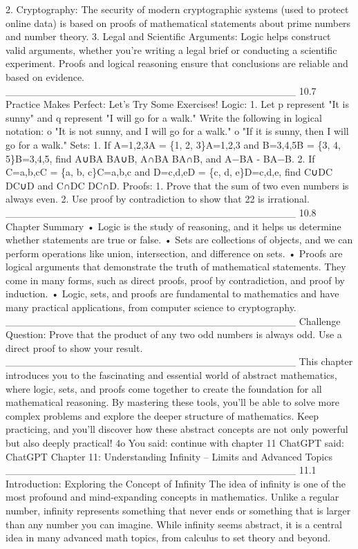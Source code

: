 2.	Cryptography: The security of modern cryptographic systems (used to protect online data) is based on proofs of mathematical statements about prime numbers and number theory.
3.	Legal and Scientific Arguments: Logic helps construct valid arguments, whether you're writing a legal brief or conducting a scientific experiment. Proofs and logical reasoning ensure that conclusions are reliable and based on evidence.
________________________________________
10.7 Practice Makes Perfect: Let’s Try Some Exercises!
Logic:
1.	Let p represent "It is sunny" and q represent "I will go for a walk." Write the following in logical notation:
o	"It is not sunny, and I will go for a walk."
o	"If it is sunny, then I will go for a walk."
Sets:
1.	If A={1,2,3}A = \{1, 2, 3\}A={1,2,3} and B={3,4,5}B = \{3, 4, 5\}B={3,4,5}, find A∪BA \cup BA∪B, A∩BA \cap BA∩B, and A−BA - BA−B.
2.	If C={a,b,c}C = \{a, b, c\}C={a,b,c} and D={c,d,e}D = \{c, d, e\}D={c,d,e}, find C∪DC \cup DC∪D and C∩DC \cap DC∩D.
Proofs:
1.	Prove that the sum of two even numbers is always even.
2.	Use proof by contradiction to show that 22 is irrational.
________________________________________
10.8 Chapter Summary
•	Logic is the study of reasoning, and it helps us determine whether statements are true or false.
•	Sets are collections of objects, and we can perform operations like union, intersection, and difference on sets.
•	Proofs are logical arguments that demonstrate the truth of mathematical statements. They come in many forms, such as direct proofs, proof by contradiction, and proof by induction.
•	Logic, sets, and proofs are fundamental to mathematics and have many practical applications, from computer science to cryptography.
________________________________________
Challenge Question:
Prove that the product of any two odd numbers is always odd. Use a direct proof to show your result.
________________________________________
This chapter introduces you to the fascinating and essential world of abstract mathematics, where logic, sets, and proofs come together to create the foundation for all mathematical reasoning. By mastering these tools, you’ll be able to solve more complex problems and explore the deeper structure of mathematics. Keep practicing, and you'll discover how these abstract concepts are not only powerful but also deeply practical!
4o
You said:
continue with chapter 11
ChatGPT said:
ChatGPT
Chapter 11: Understanding Infinity – Limits and Advanced Topics
________________________________________
11.1 Introduction: Exploring the Concept of Infinity
The idea of infinity is one of the most profound and mind-expanding concepts in mathematics. Unlike a regular number, infinity represents something that never ends or something that is larger than any number you can imagine. While infinity seems abstract, it is a central idea in many advanced math topics, from calculus to set theory and beyond.
